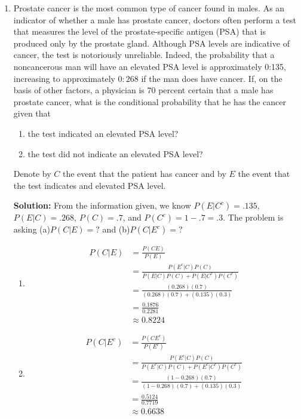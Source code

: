 \documentclass{report}
\begin{document}
\begin{enumerate}

\item Prostate cancer is the most common type of cancer found in males.
As an indicator of whether a male has prostate cancer, doctors often perform a
test that measures the level of the prostate-specific antigen (PSA) that is produced
only by the prostate gland. Although PSA levels are indicative of cancer, the test is
notoriously unreliable. Indeed, the probability that a noncancerous man will have
an elevated PSA level is approximately 0:135, increasing to approximately $0:268$ if
the man does have cancer. If, on the basis of other factors, a physician is $70$ percent
certain that a male has prostate cancer, what is the conditional probability that he
has the cancer given that
\begin{enumerate}
	\item the test indicated an elevated PSA level?
	\item the test did not indicate an elevated PSA level?
\end{enumerate}

Denote by $C$ the event that the patient has cancer and by $E$ the event that
the test indicates and elevated PSA level.

{\bf Solution:} From the information given, we know $P(E\vert C^c)=.135$, $P(E\vert C) =.268$, $P(C)=.7$, and $P(C^c)=1-.7=.3$. The problem is asking (a)$P(C\vert E)=?$ and (b)$P(C\vert E^c)=?$
\begin{enumerate}
    \item 
    \begin{align*}
        P(C\vert E) &= \frac{P(CE)}{P(E)} \\
        &=\frac{P(E^c\vert C)P(C)}{P(E\vert C)P(C)+P(E\vert C^c)P(C^c)} \\
        &=\frac{(0.268)(0.7)}{(0.268)(0.7)+(0.135)(0.3)} \\
        &=\frac{0.1876}{0.2281}\\
        &\approx 0.8224
    \end{align*}
    \item
    \begin{align*}
        P(C\vert E^c) &= \frac{P(CE^c)}{P(E^c)} \\
        &=\frac{P(E^c\vert C)P(C)}{P(E^c\vert C)P(C)+P(E^c\vert C^c)P(C^c)} \\
        &=\frac{(1-0.268)(0.7)}{(1-0.268)(0.7)+(0.135)(0.3)} \\
        &=\frac{0.5124}{0.7719} \\
        &\approx 0.6638
    \end{align*}
\end{enumerate}


\end{enumerate}
\end{document}
